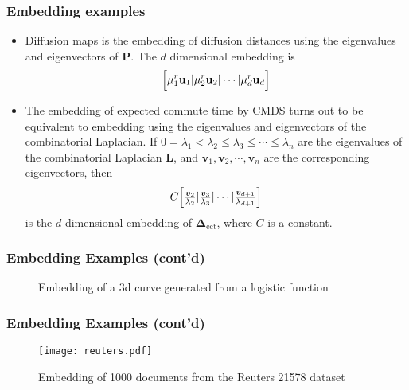 \documentclass[professionalfonts,hyperref={pdfpagelabels=false,colorlinks=true,linkcolor=red}]{beamer}
\begin{document}
\begin{frame}
  \frametitle{Embedding examples}
  \begin{itemize}
    \item<1-> Diffusion maps \cite{coifman06:_diffus_maps} is the
      embedding of diffusion distances using the eigenvalues and
      eigenvectors of $\mathbf{P}$. The $d$ dimensional embedding is
      \begin{equation*}
        \Bigl[ \mu_1^{r} \mathbf{u}_1 | \mu_{2}^{r} \mathbf{u}_2 |
        \cdots | \mu_{d}^{r}  \mathbf{u}_d \Bigr]
      \end{equation*}
    \item<2> The embedding of expected commute time by CMDS turns out
      to be equivalent to embedding using the eigenvalues and
      eigenvectors of the combinatorial
      Laplacian. If $0 = \lambda_1 < \lambda_2 \leq \lambda_3 \leq \cdots
      \leq \lambda_{n}$ are the eigenvalues of the combinatorial
      Laplacian $\mathbf{L}$, and $\bm{v}_1, \bm{v}_2, \cdots,
      \bm{v}_n$ are the corresponding eigenvectors, then
      \begin{equation}
        \label{eq:1}
        C \Bigl[ \tfrac{\bm{v}_{2}}{\lambda_2} |
        \tfrac{\bm{v}_3}{\lambda_3}
        | \cdots | \tfrac{\bm{v}_{d+1}}{\lambda_{d+1}} \Bigr]
      \end{equation}
      is the $d$ dimensional embedding of
      $\bm{\Delta}_{\mathrm{ect}}$, where $C$ is a constant.  
  \end{itemize}
\end{frame}

\begin{frame}
\frametitle{Embedding Examples (cont'd)}
  \subfiglabelskip=0pt
  \begin{figure}[htbp]
    \label{fig:logistic}
    \centering
    \hspace{3pt}
    \caption{Embedding of a 3d curve generated from a logistic function}
  \end{figure}

\end{frame}

\begin{frame}
\frametitle{Embedding Examples (cont'd)}
  \begin{figure}[htbp]
    \label{fig:reuter}
     \texttt{[image: reuters.pdf]}
    \caption{Embedding of 1000 documents from the Reuters 21578 dataset}
  \end{figure}
\end{frame}


\begin{frame}

\end{frame}
\end{document}
